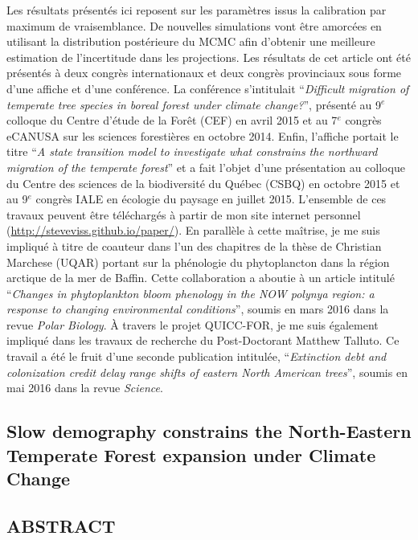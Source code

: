Les résultats présentés ici reposent sur les paramètres issus la calibration par maximum de
vraisemblance. De nouvelles simulations vont être amorcées en utilisant la distribution postérieure
du MCMC afin d'obtenir une meilleure estimation de l'incertitude dans les projections. Les résultats
de cet article ont été présentés à deux congrès internationaux et deux congrès provinciaux sous
forme d'une affiche et d'une conférence. La conférence s'intitulait \enquote{\textit{Difficult
migration of temperate tree species in boreal forest under climate change?}}, présenté au 9$^e$
colloque du Centre d'étude de la Forêt (CEF) en avril 2015 et au 7$^e$ congrès eCANUSA sur les
sciences forestières en octobre 2014. Enfin, l'affiche portait le titre \enquote{\textit{A state
transition model to investigate what constrains the northward migration of the temperate forest}} et
a fait l'objet d'une présentation au colloque du Centre des sciences de la biodiversité du Québec
(CSBQ) en octobre 2015 et au 9$^e$ congrès IALE en écologie du paysage en juillet 2015. L'ensemble
de ces travaux peuvent être téléchargés à partir de mon site internet personnel
(\url{http://steveviss.github.io/paper/}). En parallèle à cette maîtrise, je me suis impliqué à
titre de coauteur dans l'un des chapitres de la thèse de Christian Marchese (UQAR) portant sur la
phénologie du phytoplancton dans la région arctique de la mer de Baffin. Cette collaboration a
aboutie à un article intitulé \enquote{\textit{Changes in phytoplankton bloom phenology in the NOW
polynya region: a response to changing environmental conditions}}, soumis en mars 2016 dans la revue
\textit{Polar Biology}. À travers le projet QUICC-FOR, je me suis également impliqué dans les
travaux de recherche du Post-Doctorant Matthew Talluto. Ce travail a été le fruit d'une seconde
publication intitulée, \enquote{\textit{Extinction debt and colonization credit delay range shifts
of eastern North American trees}}, soumis en mai 2016 dans la revue \textit{Science}.


\newpage

\begin{spacing}{1.0}
\section{Slow demography constrains the North-Eastern Temperate Forest expansion under Climate Change}
\end{spacing}

\subsection*{\uppercase{Abstract}}


